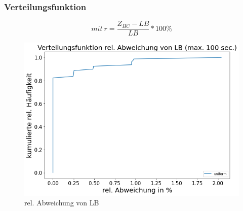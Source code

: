 \documentclass{beamer}
\begin{document}
\begin{frame}

\frametitle{Verteilungsfunktion}

\begin{footnotesize}
\begin{equation}
mit \ r = \frac{Z_{HC}-LB}{LB} * 100\%
\end{equation}
\end{footnotesize}

\begin{figure}[!htbp]
\begin{center}
\includegraphics[scale=0.3]{img/dist1.png}
\end{center}
\caption{rel. Abweichung von LB}
\label{fig:architecture}
\end{figure}



\end{frame}
\end{document}
